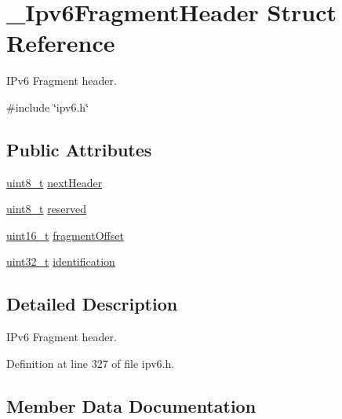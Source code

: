 \hypertarget{struct__Ipv6FragmentHeader}{}\section{\+\_\+\+Ipv6\+Fragment\+Header Struct Reference}
\label{struct__Ipv6FragmentHeader}


I\+Pv6 Fragment header.  




{\ttfamily \#include \char`\"{}ipv6.\+h\char`\"{}}

\subsection*{Public Attributes}
\begin{DoxyCompactItemize}
\item 
\hyperlink{stdint_8h_aba7bc1797add20fe3efdf37ced1182c5}{uint8\+\_\+t} \hyperlink{struct__Ipv6FragmentHeader_a4296dff4c282add1dc4098d2aa0b1f50}{next\+Header}
\item 
\hyperlink{stdint_8h_aba7bc1797add20fe3efdf37ced1182c5}{uint8\+\_\+t} \hyperlink{struct__Ipv6FragmentHeader_a61a463903d30dd497d473f84fa919949}{reserved}
\item 
\hyperlink{stdint_8h_a273cf69d639a59973b6019625df33e30}{uint16\+\_\+t} \hyperlink{struct__Ipv6FragmentHeader_a627fbd5c5737a33c7614308198d997e4}{fragment\+Offset}
\item 
\hyperlink{stdint_8h_a435d1572bf3f880d55459d9805097f62}{uint32\+\_\+t} \hyperlink{struct__Ipv6FragmentHeader_a4c6e8b11d732d2826cb96bd8de9f9ae5}{identification}
\end{DoxyCompactItemize}


\subsection{Detailed Description}
I\+Pv6 Fragment header. 

Definition at line 327 of file ipv6.\+h.



\subsection{Member Data Documentation}
\mbox{\label{struct__Ipv6FragmentHeader_a627fbd5c5737a33c7614308198d997e4}} 
